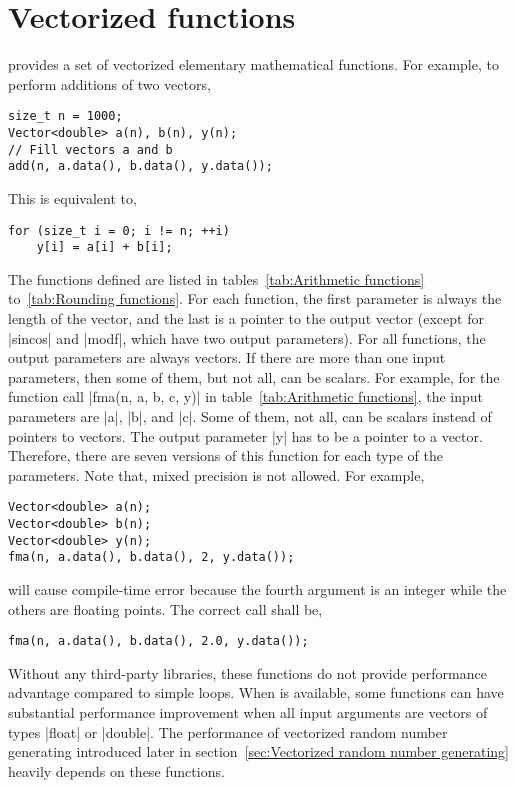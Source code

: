 \section{Vectorized functions}
\label{sec:Vectorized functions}

\mckl provides a set of vectorized elementary mathematical functions. For
example, to perform additions of two vectors,
\begin{Verbatim}
size_t n = 1000;
Vector<double> a(n), b(n), y(n);
// Fill vectors a and b
add(n, a.data(), b.data(), y.data());
\end{Verbatim}
This is equivalent to,
\begin{Verbatim}
for (size_t i = 0; i != n; ++i)
    y[i] = a[i] + b[i];
\end{Verbatim}
The functions defined are listed in tables~\ref{tab:Arithmetic functions}
to~\ref{tab:Rounding functions}. For each function, the first parameter is
always the length of the vector, and the last is a pointer to the output vector
(except for |sincos| and |modf|, which have two output parameters). For all
functions, the output parameters are always vectors. If there are more than one
input parameters, then some of them, but not all, can be scalars. For example,
for the function call |fma(n, a, b, c, y)| in table~\ref{tab:Arithmetic
functions}, the input parameters are |a|, |b|, and |c|. Some of them, not all,
can be scalars instead of pointers to vectors. The output parameter |y| has to
be a pointer to a vector. Therefore, there are seven versions of this function
for each type of the parameters. Note that, mixed precision is not allowed. For
example,
\begin{Verbatim}
Vector<double> a(n);
Vector<double> b(n);
Vector<double> y(n);
fma(n, a.data(), b.data(), 2, y.data());
\end{Verbatim}
will cause compile-time error because the fourth argument is an integer while
the others are floating points. The correct call shall be,
\begin{Verbatim}
fma(n, a.data(), b.data(), 2.0, y.data());
\end{Verbatim}
Without any third-party libraries, these functions do not provide performance
advantage compared to simple loops. When \mkl is available, some functions can
have substantial performance improvement when all input arguments are vectors
of types |float| or |double|. The performance of vectorized random number
generating introduced later in section~\ref{sec:Vectorized random number
generating} heavily depends on these functions.

